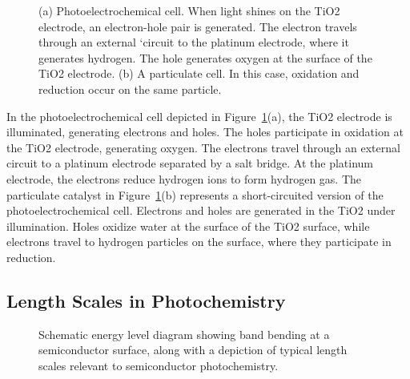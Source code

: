 \documentclass[12pt,%
              twoside,
               letterpaper]{uiothesis}
\begin{document}
\begin{figure}
	\caption[Photoelectrochemical and particulate cells]{%
		(a) Photoelectrochemical cell. When light shines on the TiO2 
		electrode, an electron-hole pair is generated. The electron 
		travels through an external `circuit to the platinum electrode, 
		where it generates hydrogen. The hole generates oxygen at the 
		surface of the TiO2 electrode. (b) A particulate cell. 
		In this case, oxidation and reduction occur on the same particle.}
	\label{fig:pecparticle}
\end{figure}

In the photoelectrochemical cell depicted in Figure~\ref{fig:pecparticle}(a), the TiO2
electrode is illuminated, generating electrons and holes. The holes participate in
oxidation at the TiO2 electrode, generating oxygen. The electrons travel through an
external circuit to a platinum electrode separated by a salt bridge. At the platinum
electrode, the electrons reduce hydrogen ions to form hydrogen gas. The particulate
catalyst in Figure~\ref{fig:pecparticle}(b) represents a short-circuited version of the
photoelectrochemical cell. Electrons and holes are generated in the TiO2 under
illumination. Holes oxidize water at the surface of the TiO2 surface, while electrons
travel to hydrogen particles on the surface, where they participate in reduction.


\subsection{Length Scales in Photochemistry}
\label{subsec:background.lengthscales} %

\begin{figure}
\begin{center}
\caption[Band bending at semiconductor surface]{%
	Schematic energy level diagram showing band bending at a semiconductor 
	surface, along with a depiction of typical length scales relevant to 
	semiconductor photochemistry.}
\label{fig:lengthscales}
\end{center}
\end{figure}
\end{document}
